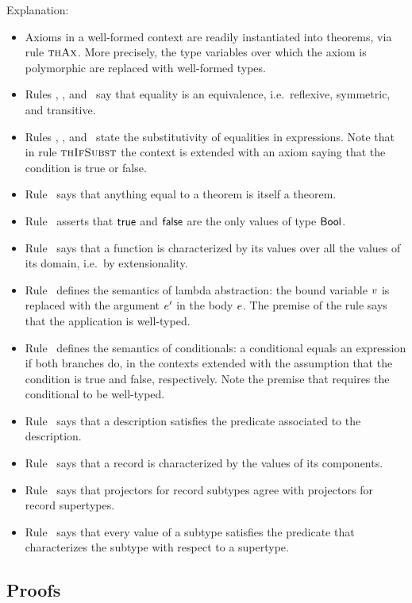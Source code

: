 Explanation:
\begin{itemize}
\item
Axioms in a well-formed context are readily instantiated into theorems, via rule
$\textsc{thAx}$. More precisely, the type variables over which the axiom is polymorphic
are replaced with well-formed types.
\item
Rules \Rthrefl, \Rthsymm, and \Rthtrans\ say that equality is an equivalence,
i.e.\ reflexive, symmetric, and transitive.
\item
Rules \Rthappsbs, \Rtheqsbs, and \Rthifsbs\ state the substitutivity of
equalities in expressions. Note that in rule $\textsc{thIfSubst}$ the context is extended
with an axiom saying that the condition is true or false.
\item
Rule \Rthsbs\ says that anything equal to a theorem is itself a theorem.
\item
Rule \Rthbool\ asserts that $\mathsf{true}$ and $\mathsf{false}$ are the only values of type
$\mathsf{Bool}$.
\item
Rule \Rthext\ says that a function is characterized by its values over all the
values of its domain, i.e.\ by extensionality.
\item
Rule \Rthabs\ defines the semantics of lambda abstraction: the bound variable
$v$ is replaced with the argument $e'$ in the body $e$. The premise
of the rule says that the application is well-typed.
\item
Rule \Rthif\ defines the semantics of conditionals: a conditional equals an
expression if both branches do, in the contexts extended with the assumption
that the condition is true and false, respectively. Note the premise that
requires the conditional to be well-typed.
\item
Rule \Rthdesc\ says that a description satisfies the predicate associated to the
description.
\item
Rule \Rthrec\ says that a record is characterized by the values of its
components.
\item
Rule \Rthprojsub\ says that projectors for record subtypes agree with projectors
for record supertypes.
\item
Rule \Rthsub\ says that every value of a subtype satisfies the predicate that
characterizes the subtype with respect to a supertype.
\end{itemize}

\subsection{Proofs}

